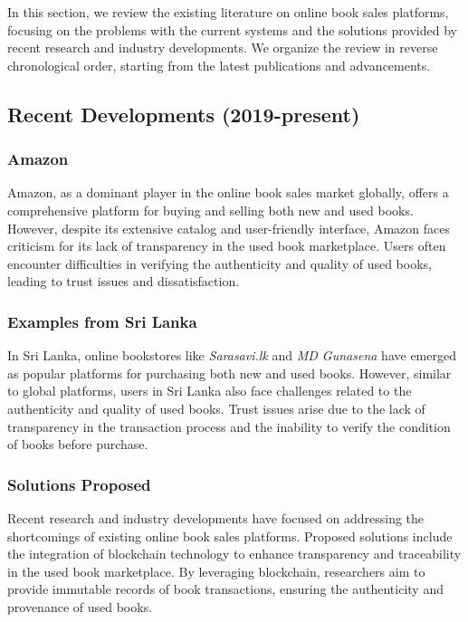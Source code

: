 \documentclass{article}
\begin{document}
In this section, we review the existing literature on online book sales platforms, focusing on the problems with the current systems and the solutions provided by recent research and industry developments. We organize the review in reverse chronological order, starting from the latest publications and advancements.

\subsection{Recent Developments (2019-present)}

\subsubsection{Amazon}

Amazon, as a dominant player in the online book sales market globally, offers a comprehensive platform for buying and selling both new and used books. However, despite its extensive catalog and user-friendly interface, Amazon faces criticism for its lack of transparency in the used book marketplace. Users often encounter difficulties in verifying the authenticity and quality of used books, leading to trust issues and dissatisfaction.

\subsubsection{Examples from Sri Lanka}

In Sri Lanka, online bookstores like \textit{Sarasavi.lk} and \textit{MD Gunasena} have emerged as popular platforms for purchasing both new and used books. However, similar to global platforms, users in Sri Lanka also face challenges related to the authenticity and quality of used books. Trust issues arise due to the lack of transparency in the transaction process and the inability to verify the condition of books before purchase.

\subsubsection{Solutions Proposed}

Recent research and industry developments have focused on addressing the shortcomings of existing online book sales platforms. Proposed solutions include the integration of blockchain technology to enhance transparency and traceability in the used book marketplace. By leveraging blockchain, researchers aim to provide immutable records of book transactions, ensuring the authenticity and provenance of used books.
\end{document}
